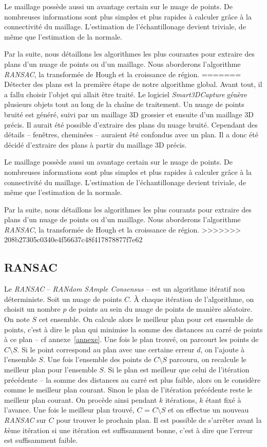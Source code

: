 ﻿\documentclass[12pt, twoside]{article}
\begin{document}
Le maillage possède aussi un avantage certain sur le nuage de points. De nombreuses informations sont plus simples et plus rapides à calculer grâce à la connectivité du maillage. L'estimation de l'échantillonage devient triviale, de même que l'estimation de la normale.

Par la suite, nous détaillons les algorithmes les plus courantes pour extraire des plans d'un nuage de points ou d'un maillage. Nous aborderons l'algorithme \textit{RANSAC}, la transformée de Hough et la croissance de région.
=======
Détecter des plans est la première étape de notre algorithme global. Avant tout, il a fallu choisir l'objet qui allait être traité. Le logiciel \textit{Smart3DCapture} génère plusieurs objets tout au long de la chaîne de traitement. Un nuage de points bruité est généré, suivi par un maillage 3D grossier et ensuite d'un maillage 3D précis. Il aurait été possible d'extraire des plans du nuage bruité. Cependant des détails -- fenêtres, cheminées -- auraient êté confondus avec un plan. Il a donc été décidé d'extraire des plans à partir du maillage 3D précis.

Le maillage possède aussi un avantage certain sur le nuage de points. De nombreuses informations sont plus simples et plus rapides à calculer grâce à la connectivité du maillage. L'estimation de l'échantillonage devient triviale, de même que l'estimation de la normale.

Par la suite, nous détaillons les algorithmes les plus courants pour extraire des plans d'un nuage de points ou d'un maillage. Nous aborderons l'algorithme \textit{RANSAC}, la transformée de Hough et la croissance de région.
>>>>>>> 208b27305c0340e4f56637c48f417878877f7e62

\subsection{RANSAC}
Le \textit{RANSAC} -- \textit{RANdom SAmple Consensus} -- est un algorithme itératif non déterministe. Soit un nuage de points $C$. À chaque itération de l’algorithme, on choisit un nombre $p$ de points au sein du nuage de points de manière aléatoire. On note $S$ cet ensemble. On calcule alors le meilleur plan pour cet ensemble de points, c’est à dire le plan qui minimise la somme des distances au carré de points à ce plan -- cf annexe~\ref{annexe}. Une fois le plan trouvé, on parcourt les points de $C\setminus S$. Si le point correspond au plan avec une certaine erreur $d$, on l’ajoute à l’ensemble $S$. Une fois l’ensemble des points de $C\setminus S$ parcouru, on recalcule le meilleur plan pour l’ensemble $S$. Si le plan est meilleur que celui de l’itération précédente -- la somme des distances au carré est plus faible, alors on le considère comme le meilleur plan courant. Sinon le plan de l’itération précédente reste le meilleur plan courant. On procède ainsi pendant $k$ itérations, $k$ étant fixé à l’avance. Une fois le meilleur plan trouvé, $C$ = $C\setminus S$ et on effectue un nouveau \textit{RANSAC} sur $C$ pour trouver le prochain plan. Il est possible de s’arrêter avant la $k$ème itération si une itération est suffisamment bonne, c’est à dire que l’erreur est suffisamment faible.
\end{document}
